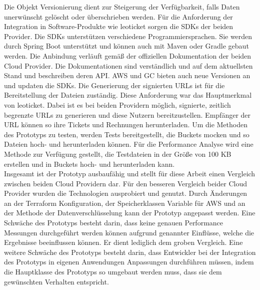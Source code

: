 Die Objekt Versionierung dient zur Steigerung der Verfügbarkeit, falls Daten unerwünscht gelöscht oder überschrieben werden. Für die Anforderung der Integration in Software-Produkte wie leoticket sorgen die SDKs der beiden Provider. Die SDKs unterstützen verschiedene Programmiersprachen. Sie werden durch Spring Boot unterstützt und können auch mit Maven oder Gradle gebaut werden. Die Anbindung verläuft gemäß der offiziellen Dokumentation der beiden Cloud Provider. Die Dokumentationen sind verständlich und auf dem aktuellsten Stand und beschreiben deren API. AWS und GC bieten auch neue Versionen an und updaten die SDKs. Die Generierung der signierten URLs ist für die Bereitstellung der Dateien zuständig. Diese Anforderung war das Hauptmerkmal von leoticket. Dabei ist es bei beiden Providern möglich, signierte, zeitlich begrenzte URLs zu generieren und diese Nutzern bereitzustellen. Empfänger der URL können so ihre Tickets und Rechnungen herunterladen. Um die Methoden des Prototyps zu testen, werden Tests bereitgestellt, die Buckets mocken und so Dateien hoch- und herunterladen können. Für die Performance Analyse wird eine Methode zur Verfügung gestellt, die Testdateien in der Größe von 100 KB erstellen und in Buckets hoch- und herunterladen kann.\\

Insgesamt ist der Prototyp ausbaufähig und stellt für diese Arbeit einen Vergleich zwischen beiden Cloud Providern dar. Für den besseren Vergleich beider Cloud Provider wurden die Technologien ausprobiert und genutzt. Durch Änderungen an der Terraform Konfiguration, der Speicherklassen Variable für AWS und an der Methode der Datenverschlüsselung kann der Prototyp angepasst werden. Eine Schwäche des Prototyps besteht darin, dass keine genauen Performance Messungen durchgeführt werden können aufgrund genannter Einflüsse, welche die Ergebnisse beeinflussen können. Er dient lediglich dem groben Vergleich. Eine weitere Schwäche des Prototyps besteht darin, dass Entwickler bei der Integration des Prototyps in eigenen Anwendungen Anpassungen durchführen müssen, indem die Hauptklasse des Prototyps so umgebaut werden muss, dass sie dem gewünschten Verhalten entspricht.